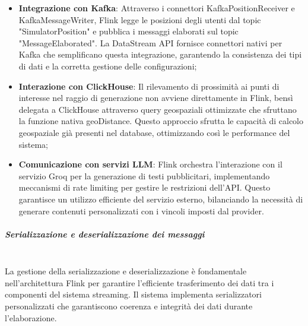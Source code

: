 \documentclass[10pt]{article}
\newcommand{\mysubparagraph}[1]{\subparagraph{#1}\mbox{}\\}
\begin{document}
        \begin{itemize}
            \item \textbf{Integrazione con Kafka}: Attraverso i connettori KafkaPositionReceiver e KafkaMessageWriter, Flink legge le posizioni degli utenti dal topic "SimulatorPosition" e pubblica i messaggi elaborati sul topic "MessageElaborated". La DataStream API fornisce connettori nativi per Kafka che semplificano questa integrazione, garantendo la consistenza dei tipi di dati e la corretta gestione delle configurazioni;

            \item \textbf{Interazione con ClickHouse}: Il rilevamento di prossimità ai punti di interesse nel raggio di generazione non avviene direttamente in Flink, bensì delegata a ClickHouse attraverso query geospaziali ottimizzate che sfruttano la funzione nativa geoDistance. Questo approccio sfrutta le capacità di calcolo geospaziale già presenti nel database, ottimizzando così le performance del sistema;

            \item \textbf{Comunicazione con servizi LLM}: Flink orchestra l'interazione con il servizio Groq per la generazione di testi pubblicitari, implementando meccanismi di rate limiting per gestire le restrizioni dell'API. Questo garantisce un utilizzo efficiente del servizio esterno, bilanciando la necessità di generare contenuti personalizzati con i vincoli imposti dal provider.
        \end{itemize}

        \mysubparagraph{Serializzazione e deserializzazione dei messaggi}
        La gestione della serializzazione e deserializzazione è fondamentale nell'architettura Flink per garantire l'efficiente trasferimento dei dati tra i componenti del sistema streaming. Il sistema implementa serializzatori personalizzati che garantiscono coerenza e integrità dei dati durante l'elaborazione.
\end{document}
